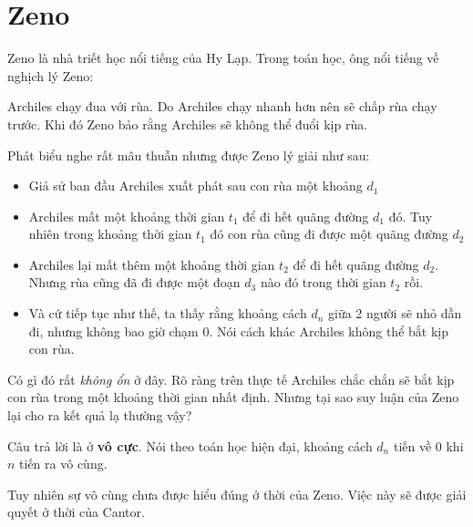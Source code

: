 \chapter{Zeno}

Zeno là nhà triết học nổi tiếng của Hy Lạp. Trong toán học, ông nổi tiếng về nghịch lý Zeno:

Archiles chạy đua với rùa. Do Archiles chạy nhanh hơn nên sẽ chấp rùa chạy trước. Khi đó Zeno bảo rằng Archiles sẽ không thể đuổi kịp rùa.

Phát biểu nghe rất mâu thuẫn nhưng được Zeno lý giải như sau:

\begin{itemize}[noitemsep]
    \item Giả sử ban đầu Archiles xuất phát sau con rùa một khoảng $d_1$
    \item Archiles mất một khoảng thời gian $t_1$ để đi hết quãng đường $d_1$ đó. Tuy nhiên trong khoảng thời gian $t_1$ đó con rùa cũng đi được một quãng đường $d_2$
    \item Archiles lại mất thêm một khoảng thời gian $t_2$ để đi hết quãng đường $d_2$. Nhưng rùa cũng đã đi được một đoạn $d_3$ nào đó trong thời gian $t_2$ rồi.
    \item Và cứ tiếp tục như thế, ta thấy rằng khoảng cách $d_n$ giữa 2 người sẽ nhỏ dần đi, nhưng không bao giờ chạm 0. Nói cách khác Archiles không thể bắt kịp con rùa.
\end{itemize}

Có gì đó rất \textit{không ổn} ở đây. Rõ ràng trên thực tế Archiles chắc chắn sẽ bắt kịp con rùa trong một khoảng thời gian nhất định. Nhưng tại sao suy luận của Zeno lại cho ra kết quả lạ thường vậy?

Câu trả lời là ở \textbf{vô cực}. Nói theo toán học hiện đại, khoảng cách $d_n$ tiến về 0 khi $n$ tiến ra vô cùng.

Tuy nhiên sự vô cùng chưa được hiểu đúng ở thời của Zeno. Việc này sẽ được giải quyết ở thời của Cantor.